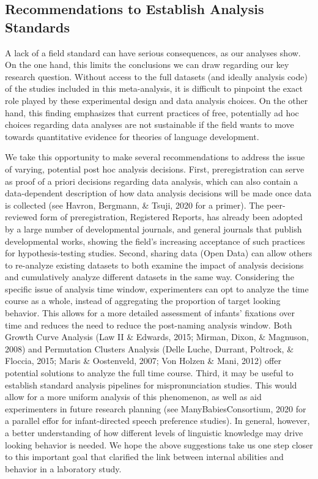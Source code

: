\documentclass[man]{apa6}
\begin{document}
\hypertarget{recommendations-to-establish-analysis-standards}{%
\subsection{Recommendations to Establish Analysis Standards}\label{recommendations-to-establish-analysis-standards}}

A lack of a field standard can have serious consequences, as our analyses show. On the one hand, this limits the conclusions we can draw regarding our key research question. Without access to the full datasets (and ideally analysis code) of the studies included in this meta-analysis, it is difficult to pinpoint the exact role played by these experimental design and data analysis choices. On the other hand, this finding emphasizes that current practices of free, potentially ad hoc choices regarding data analyses are not sustainable if the field wants to move towards quantitative evidence for theories of language development.

We take this opportunity to make several recommendations to address the issue of varying, potential post hoc analysis decisions. First, preregistration can serve as proof of a priori decisions regarding data analysis, which can also contain a data-dependent description of how data analysis decisions will be made once data is collected (see Havron, Bergmann, \& Tsuji, 2020 for a primer). The peer-reviewed form of preregistration, Registered Reports, has already been adopted by a large number of developmental journals, and general journals that publish developmental works, showing the field's increasing acceptance of such practices for hypothesis-testing studies. Second, sharing data (Open Data) can allow others to re-analyze existing datasets to both examine the impact of analysis decisions and cumulatively analyze different datasets in the same way. Considering the specific issue of analysis time window, experimenters can opt to analyze the time course as a whole, instead of aggregating the proportion of target looking behavior. This allows for a more detailed assessment of infants' fixations over time and reduces the need to reduce the post-naming analysis window. Both Growth Curve Analysis (Law II \& Edwards, 2015; Mirman, Dixon, \& Magnuson, 2008) and Permutation Clusters Analysis (Delle Luche, Durrant, Poltrock, \& Floccia, 2015; Maris \& Oostenveld, 2007; Von Holzen \& Mani, 2012) offer potential solutions to analyze the full time course. Third, it may be useful to establish standard analysis pipelines for mispronunciation studies. This would allow for a more uniform analysis of this phenomenon, as well as aid experimenters in future research planning (see ManyBabiesConsortium, 2020 for a parallel effor for infant-directed speech preference studies). In general, however, a better understanding of how different levels of linguistic knowledge may drive looking behavior is needed. We hope the above suggestions take us one step closer to this important goal that clarified the link between internal abilities and behavior in a laboratory study.
\end{document}
